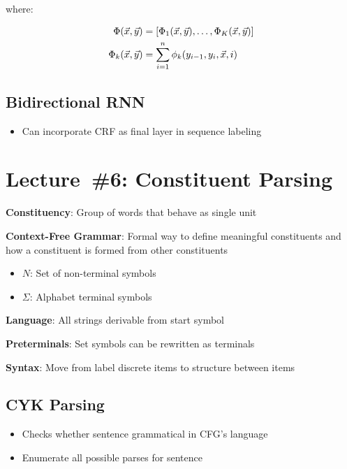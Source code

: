 \documentclass[9pt]{extarticle}
\renewcommand{\green}[1]{{\color{ForestGreen} #1}}
\begin{document}
\begin{multicols}{3}
  where:

  \begin{align*}
      \Phi(\vec{x},\vec{y}) &= \lbrack\Phi_{1}(\vec{x},\vec{y}),\ldots,\Phi_{K}(\vec{x},\vec{y})\rbrack \\
      \Phi_{k}(\vec{x},\vec{y}) &= \sum_{i=1}^{n} \phi_{k}(y_{i-1},y_{i},\vec{x},i)
  \end{align*}

  \subsection*{Bidirectional RNN}

  \begin{itemize}
    \item Can incorporate CRF as final layer in sequence labeling
  \end{itemize}

  \section*{Lecture~\#6: Constituent Parsing}

  \textbf{\green{Constituency}}: Group of words that behave as single unit

  \textbf{\green{Context-Free Grammar}}: Formal way to define meaningful constituents and how a constituent is formed from other constituents
  \begin{itemize}
    \item $N$: Set of non-terminal symbols
    \item $\Sigma$: Alphabet terminal symbols
  \end{itemize}

  \textbf{Language}: All strings derivable from start symbol

  \textbf{Preterminals}: Set symbols can be rewritten as terminals

  \textbf{Syntax}: Move from label discrete items to structure between items

  \subsection*{CYK Parsing}

  \begin{itemize}
    \item Checks whether sentence grammatical in CFG's language
    \item Enumerate all possible parses for sentence
  \end{itemize}


\end{multicols}
\end{document}
